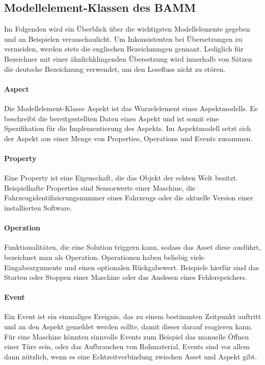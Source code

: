 \subsection{Modellelement-Klassen des BAMM}

Im Folgenden wird ein Überblick über die wichtigsten Modellelemente gegeben und an Beispielen veranschaulicht. Um Inkonsistenten bei Übersetzungen zu vermeiden, werden stets die englischen Bezeichnungen gennant. Lediglich für Bezeichner mit einer ähnlichklingenden Übersetzung wird innerhalb von Sätzen die deutsche Bezeichnung verwendet, um den Lesefluss nicht zu stören.

\paragraph{Aspect} Die Modellelement-Klasse Aspekt ist das Wurzelelement eines Aspektmodells. Es beschreibt die bereitgestellten Daten eines Aspekt und ist somit eine Spezifikation für die Implementierung des Aspekts. Im Aspektmodell setzt sich der Aspekt aus einer Menge von Properties, Operations und Events zusammen.

\paragraph{Property} Eine Property ist eine Eigenschaft, die das Objekt der echten Welt besitzt. Beispielhafte Properties sind Sensorwerte einer Maschine, die Fahrzeugidentifizierungsnummer eines Fahrzeugs oder die aktuelle Version einer installierten Software.

\paragraph{Operation} Funktionalitäten, die eine Solution triggern kann, sodass das Asset diese ausführt, bezeichnet man als Operation. Operationen haben beliebig viele Eingabeargumente und einen optionalen Rückgabewert. Beispiele hierfür sind das Starten oder Stoppen einer Maschine oder das Auslesen eines Fehlerspeichers.

\paragraph{Event} Ein Event ist ein einmaliges Ereignis, das zu einem bestimmten Zeitpunkt auftritt und an den Aspekt gemeldet werden sollte, damit dieser darauf reagieren kann. Für eine Maschine könnten sinnvolle Events zum Beispiel das manuelle Öffnen einer Türe sein, oder das Aufbrauchen von Rohmaterial. Events sind vor allem dann nützlich, wenn es eine Echtzeitverbindung zwischen Asset und Aspekt gibt.

